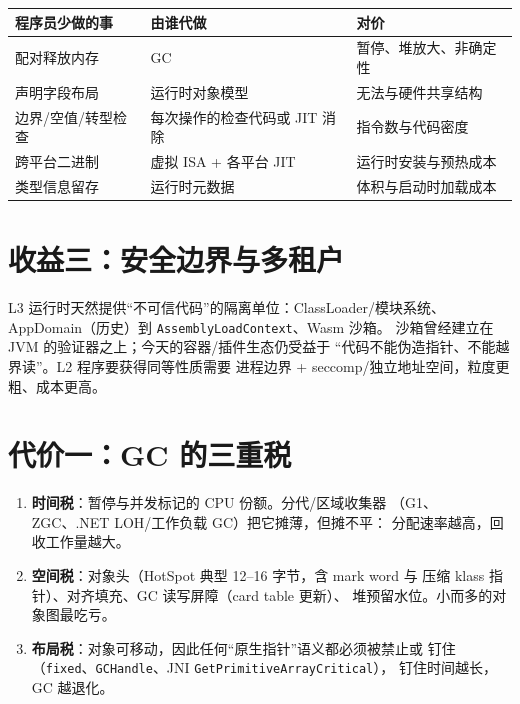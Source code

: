\documentclass[12pt,a4paper,fontset=fandol]{ctexbook}
\begin{document}
\begin{compare}[title=``少写的代码''清单]
\begin{tabular}{@{}p{}p{}p{}@{}}
\toprule
\textbf{程序员少做的事} & \textbf{由谁代做} & \textbf{对价} \\
\midrule
配对释放内存 & GC & 暂停、堆放大、非确定性 \\
声明字段布局 & 运行时对象模型 & 无法与硬件共享结构 \\
边界/空值/转型检查 & 每次操作的检查代码或 JIT 消除 & 指令数与代码密度 \\
跨平台二进制 & 虚拟 ISA + 各平台 JIT & 运行时安装与预热成本 \\
类型信息留存 & 运行时元数据 & 体积与启动时加载成本 \\
\bottomrule
\end{tabular}
\end{compare}

\section{收益三：安全边界与多租户}

L3 运行时天然提供``不可信代码''的隔离单位：ClassLoader/模块系统、
AppDomain（历史）到 \texttt{AssemblyLoadContext}、Wasm 沙箱。
沙箱曾经建立在 JVM 的验证器之上；今天的容器/插件生态仍受益于
``代码不能伪造指针、不能越界读''。L2 程序要获得同等性质需要
进程边界 + seccomp/独立地址空间，粒度更粗、成本更高。

\section{代价一：GC 的三重税}

\begin{enumerate}
  \item \textbf{时间税}：暂停与并发标记的 CPU 份额。分代/区域收集器
        （G1、ZGC、.NET LOH/工作负载 GC）把它摊薄，但摊不平：
        分配速率越高，回收工作量越大。
  \item \textbf{空间税}：对象头（HotSpot 典型 12--16 字节，含 mark word 与
        压缩 klass 指针）、对齐填充、GC 读写屏障（card table 更新）、
        堆预留水位。小而多的对象图最吃亏。
  \item \textbf{布局税}：对象可移动，因此任何``原生指针''语义都必须被禁止或
        钉住（\texttt{fixed}、\texttt{GCHandle}、JNI \texttt{GetPrimitiveArrayCritical}），
        钉住时间越长，GC 越退化。
\end{enumerate}
\end{document}
